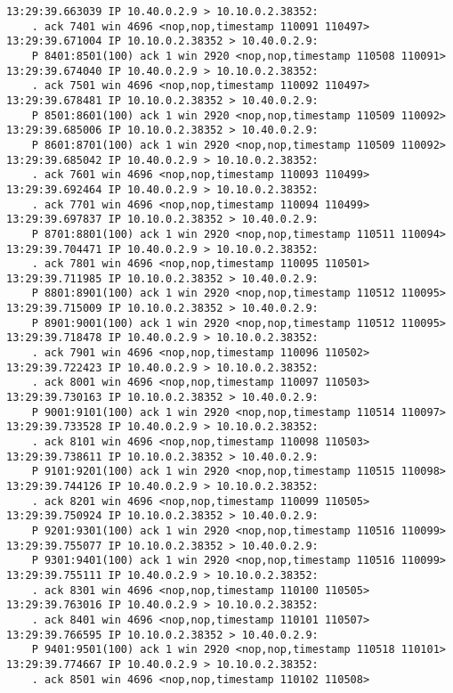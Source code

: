 \documentclass[a4paper,12pt]{article}
\begin{document}
\begin{Verbatim}
13:29:39.663039 IP 10.40.0.2.9 > 10.10.0.2.38352: 
    . ack 7401 win 4696 <nop,nop,timestamp 110091 110497>
13:29:39.671004 IP 10.10.0.2.38352 > 10.40.0.2.9: 
    P 8401:8501(100) ack 1 win 2920 <nop,nop,timestamp 110508 110091>
13:29:39.674040 IP 10.40.0.2.9 > 10.10.0.2.38352: 
    . ack 7501 win 4696 <nop,nop,timestamp 110092 110497>
13:29:39.678481 IP 10.10.0.2.38352 > 10.40.0.2.9: 
    P 8501:8601(100) ack 1 win 2920 <nop,nop,timestamp 110509 110092>
13:29:39.685006 IP 10.10.0.2.38352 > 10.40.0.2.9: 
    P 8601:8701(100) ack 1 win 2920 <nop,nop,timestamp 110509 110092>
13:29:39.685042 IP 10.40.0.2.9 > 10.10.0.2.38352: 
    . ack 7601 win 4696 <nop,nop,timestamp 110093 110499>
13:29:39.692464 IP 10.40.0.2.9 > 10.10.0.2.38352: 
    . ack 7701 win 4696 <nop,nop,timestamp 110094 110499>
13:29:39.697837 IP 10.10.0.2.38352 > 10.40.0.2.9: 
    P 8701:8801(100) ack 1 win 2920 <nop,nop,timestamp 110511 110094>
13:29:39.704471 IP 10.40.0.2.9 > 10.10.0.2.38352: 
    . ack 7801 win 4696 <nop,nop,timestamp 110095 110501>
13:29:39.711985 IP 10.10.0.2.38352 > 10.40.0.2.9: 
    P 8801:8901(100) ack 1 win 2920 <nop,nop,timestamp 110512 110095>
13:29:39.715009 IP 10.10.0.2.38352 > 10.40.0.2.9: 
    P 8901:9001(100) ack 1 win 2920 <nop,nop,timestamp 110512 110095>
13:29:39.718478 IP 10.40.0.2.9 > 10.10.0.2.38352: 
    . ack 7901 win 4696 <nop,nop,timestamp 110096 110502>
13:29:39.722423 IP 10.40.0.2.9 > 10.10.0.2.38352: 
    . ack 8001 win 4696 <nop,nop,timestamp 110097 110503>
13:29:39.730163 IP 10.10.0.2.38352 > 10.40.0.2.9: 
    P 9001:9101(100) ack 1 win 2920 <nop,nop,timestamp 110514 110097>
13:29:39.733528 IP 10.40.0.2.9 > 10.10.0.2.38352: 
    . ack 8101 win 4696 <nop,nop,timestamp 110098 110503>
13:29:39.738611 IP 10.10.0.2.38352 > 10.40.0.2.9: 
    P 9101:9201(100) ack 1 win 2920 <nop,nop,timestamp 110515 110098>
13:29:39.744126 IP 10.40.0.2.9 > 10.10.0.2.38352: 
    . ack 8201 win 4696 <nop,nop,timestamp 110099 110505>
13:29:39.750924 IP 10.10.0.2.38352 > 10.40.0.2.9: 
    P 9201:9301(100) ack 1 win 2920 <nop,nop,timestamp 110516 110099>
13:29:39.755077 IP 10.10.0.2.38352 > 10.40.0.2.9: 
    P 9301:9401(100) ack 1 win 2920 <nop,nop,timestamp 110516 110099>
13:29:39.755111 IP 10.40.0.2.9 > 10.10.0.2.38352: 
    . ack 8301 win 4696 <nop,nop,timestamp 110100 110505>
13:29:39.763016 IP 10.40.0.2.9 > 10.10.0.2.38352: 
    . ack 8401 win 4696 <nop,nop,timestamp 110101 110507>
13:29:39.766595 IP 10.10.0.2.38352 > 10.40.0.2.9: 
    P 9401:9501(100) ack 1 win 2920 <nop,nop,timestamp 110518 110101>
13:29:39.774667 IP 10.40.0.2.9 > 10.10.0.2.38352: 
    . ack 8501 win 4696 <nop,nop,timestamp 110102 110508>

\end{Verbatim}
\end{document}
